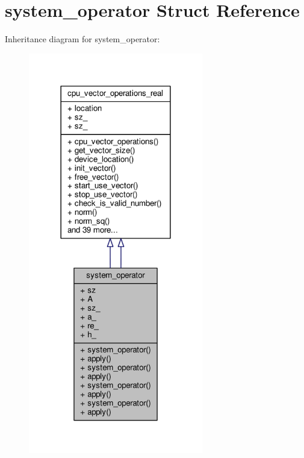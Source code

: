 \hypertarget{structsystem__operator}{\section{system\-\_\-operator Struct Reference}
\label{structsystem__operator}
}


Inheritance diagram for system\-\_\-operator\-:\nopagebreak
\begin{figure}[H]
\begin{center}
\leavevmode
\includegraphics[width=216pt]{structsystem__operator__inherit__graph}
\end{center}
\end{figure}


